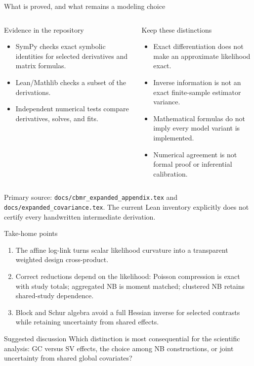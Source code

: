 \documentclass[aspectratio=169,10pt]{beamer}
\begin{document}
\begin{frame}{What is proved, and what remains a modeling choice}
\begin{columns}[T,onlytextwidth]
\begin{block}{Evidence in the repository}
\begin{itemize}
  \item SymPy checks exact symbolic identities for selected derivatives and
        matrix formulas.
  \item Lean/Mathlib checks a subset of the derivations.
  \item Independent numerical tests compare derivatives, solves, and fits.
\end{itemize}
\end{block}
\begin{block}{Keep these distinctions}
\begin{itemize}
  \item Exact differentiation does not make an approximate likelihood exact.
  \item Inverse information is not an exact finite-sample estimator variance.
  \item Mathematical formulas do not imply every model variant is implemented.
  \item Numerical agreement is not formal proof or inferential calibration.
\end{itemize}
\end{block}
\end{columns}
\vfill
\small Primary source: \texttt{docs/cbmr\_expanded\_appendix.tex} and
\texttt{docs/expanded\_covariance.tex}. The current Lean inventory explicitly
does not certify every handwritten intermediate derivation.
\end{frame}

\begin{frame}{Take-home points}
\begin{enumerate}
  \item The affine log-link turns scalar likelihood curvature into a transparent
        weighted design cross-product.
  \item Correct reductions depend on the likelihood: Poisson compression is
        exact with study totals; aggregated NB is moment matched; clustered NB
        retains shared-study dependence.
  \item Block and Schur algebra avoid a full Hessian inverse for selected
        contrasts while retaining uncertainty from shared effects.
\end{enumerate}
\vfill
\begin{block}{Suggested discussion}
Which distinction is most consequential for the scientific analysis:
GC versus SV effects, the choice among NB constructions, or joint uncertainty
from shared global covariates?
\end{block}
\end{frame}
\end{document}
